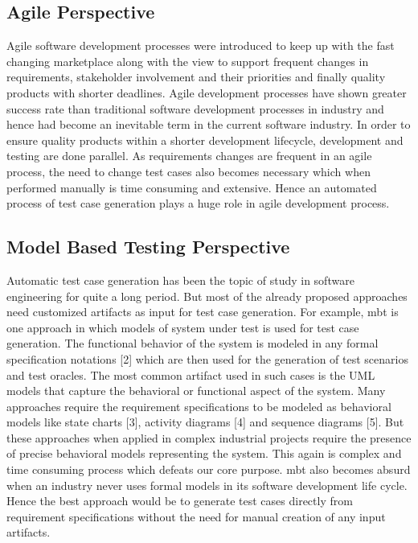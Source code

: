 \subsection{Agile Perspective}
Agile software development processes \cite{ambler2009agile} were introduced to keep up with the fast changing marketplace along with the view to support frequent changes in requirements, stakeholder involvement and their priorities and finally quality products with shorter deadlines. Agile development processes have shown greater success rate than traditional software development processes in industry and hence had become an inevitable term in the current software industry. In order to ensure quality products within a shorter development lifecycle, development and testing are done parallel. As requirements changes are frequent in an agile process, the need to change test cases also becomes necessary which when performed manually is time consuming and extensive. Hence an automated process of test case generation plays a huge role in agile development process.
\subsection{Model Based Testing Perspective}
Automatic test case generation has been the topic of study in software engineering for quite a long period. But most of the already proposed approaches need customized artifacts as input for test case generation. For example, \gls{mbt} is one approach in which models of system under test is used for test case generation.  The functional behavior of the system is modeled in any formal specification notations [2] which are then used for the generation of test scenarios and test oracles. The most common artifact used in such cases is the UML models that capture the behavioral or functional aspect of the system. Many approaches require the requirement specifications to be modeled as  behavioral models like state charts [3], activity diagrams [4] and sequence diagrams [5].  But these approaches when applied in complex industrial projects require the presence of precise behavioral models representing the system. This again is complex and time consuming process which defeats our core purpose. \gls{mbt} also becomes absurd when an industry never uses formal models in its software development life cycle.  Hence the best approach would be to generate test cases directly from requirement specifications without the need for manual creation of any input artifacts.
